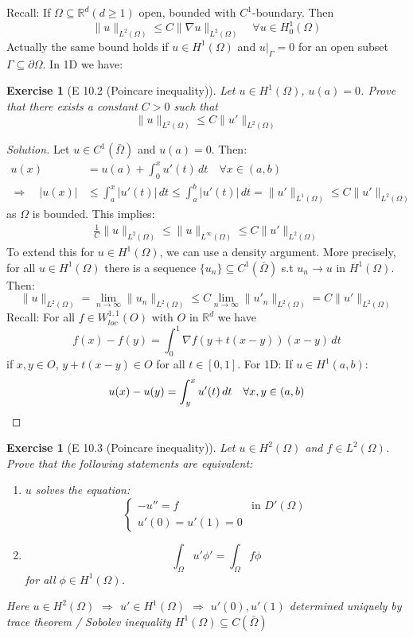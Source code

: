 \documentclass{report}
\theoremstyle{tommy}
\newtheorem{ex}[defn]{Exercise}
\begin{document}
  Recall: If \(\Omega \subseteq \mathbb{R}^d (d \ge 1)\) open, bounded with \(C^1\)-boundary. Then 
  \[\|u\|_{L^2(\Omega)} \le C \|\nabla u\|_{L^2(\Omega)} \quad \forall u \in H_0^1(\Omega)\]
  Actually the same bound holds if \(u \in H^1(\Omega)\) and \(u|_\Gamma = 0\) for an open subset \(\Gamma \subseteq \partial \Omega\). In 1D we have:


  \begin{ex}[E 10.2 (Poincare inequality)]
    Let \(u \in H^1(\Omega)\), \(u(a) = 0\).
    Prove that there exists a constant \(C > 0\) such that 
    \[\|u\|_{L^2(\Omega)} \le C \|u'\|_{L^2(\Omega)}\]
  \end{ex}

  \begin{proof}[Solution]
    Let \(u \in C^1(\bar \Omega)\) and \(u(a) = 0\). Then:
    \begin{align*}
      u(x) &= u(a) + \int_0^x u'(t) \, dt \quad \forall x \in (a,b) \\ 
      \Rightarrow \quad |u(x)| &\le \int_a^x |u'(t)|\, dt \le \int_a^b|u'(t)| \, dt = \|u'\|_{L^1(\Omega)} \le C\|u'\|_{L^2(\Omega)}
    \end{align*}
    as \(\Omega\) is bounded. This implies:
    \begin{align*}
      \frac{1}{C} \|u\|_{L^2(\Omega)} \le \|u\|_{L^\infty(\Omega)} \le C \|u'\|_{L^2(\Omega)}
    \end{align*}
    To extend this for \(u \in H^1(\Omega)\), we can use a density argument. More precisely, for all \(u \in H^1(\Omega)\) there is a sequence \(\{u_n\} \subseteq C^1(\bar \Omega)\) s.t \(u_n \to u\) in \(H^1(\Omega)\). Then:
    \[\|u\|_{L^2(\Omega)} = \lim_{n \to \infty} \|u_n\|_{L^2(\Omega)} \le C \lim_{n \to \infty} \|u'_n\|_{L^2(\Omega)} = C\|u'\|_{L^2(\Omega)}\]
    Recall: For all \(f \in W_{loc}^{1,1}(O)\) with \(O\) in \(\mathbb{R}^d\) we have
    \[
      f(x) - f(y) = \int_0^1\nabla f(y + t(x-y))(x-y) \, dt 
    \]
    if \(x,y \in O\), \(y + t(x-y) \in O\) for all \(t \in [0,1]\). For 1D: If \(u \in H^1(a,b)\):
    \[
      u(x) - u(y) = \int_y^x u'(t) \, dt \quad \forall x,y \in (a,b) \qedhere
    \]
  \end{proof}

  \begin{ex}[E 10.3 (Poincare inequality)]
    Let \(u \in H^2(\Omega)\) and \(f \in L^2(\Omega)\). Prove that the following statements are equivalent:
    \begin{enumerate}[label=\alph*)]
      \item \(u\) solves the equation:
      \[\begin{cases}
        - u'' = f & \text{in } D'(\Omega) \\ u'(0) = u'(1) = 0
      \end{cases}\]
      \item \[\int_\Omega u' \phi' = \int_\Omega f \phi\] for all \(\phi \in H^1(\Omega)\).
    \end{enumerate}
    Here \(u \in H^2(\Omega)\) \(\Rightarrow\) \(u' \in H^1(\Omega)\) \(\Rightarrow\) \(u'(0), u'(1)\) determined uniquely by trace theorem / Sobolev inequality \(H^1(\Omega) \subseteq C(\bar \Omega)\) 
  \end{ex}
\end{document}
